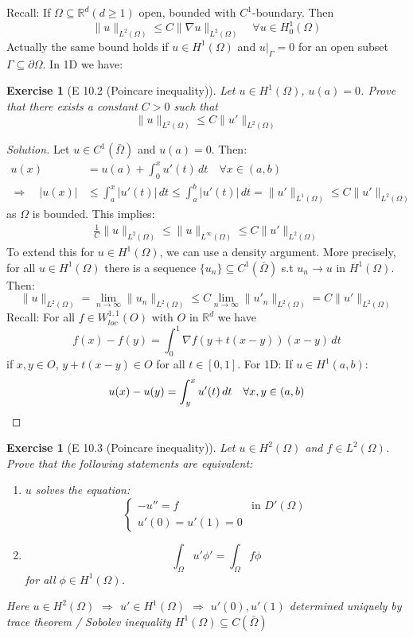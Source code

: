 \documentclass{report}
\theoremstyle{tommy}
\newtheorem{ex}[defn]{Exercise}
\begin{document}
  Recall: If \(\Omega \subseteq \mathbb{R}^d (d \ge 1)\) open, bounded with \(C^1\)-boundary. Then 
  \[\|u\|_{L^2(\Omega)} \le C \|\nabla u\|_{L^2(\Omega)} \quad \forall u \in H_0^1(\Omega)\]
  Actually the same bound holds if \(u \in H^1(\Omega)\) and \(u|_\Gamma = 0\) for an open subset \(\Gamma \subseteq \partial \Omega\). In 1D we have:


  \begin{ex}[E 10.2 (Poincare inequality)]
    Let \(u \in H^1(\Omega)\), \(u(a) = 0\).
    Prove that there exists a constant \(C > 0\) such that 
    \[\|u\|_{L^2(\Omega)} \le C \|u'\|_{L^2(\Omega)}\]
  \end{ex}

  \begin{proof}[Solution]
    Let \(u \in C^1(\bar \Omega)\) and \(u(a) = 0\). Then:
    \begin{align*}
      u(x) &= u(a) + \int_0^x u'(t) \, dt \quad \forall x \in (a,b) \\ 
      \Rightarrow \quad |u(x)| &\le \int_a^x |u'(t)|\, dt \le \int_a^b|u'(t)| \, dt = \|u'\|_{L^1(\Omega)} \le C\|u'\|_{L^2(\Omega)}
    \end{align*}
    as \(\Omega\) is bounded. This implies:
    \begin{align*}
      \frac{1}{C} \|u\|_{L^2(\Omega)} \le \|u\|_{L^\infty(\Omega)} \le C \|u'\|_{L^2(\Omega)}
    \end{align*}
    To extend this for \(u \in H^1(\Omega)\), we can use a density argument. More precisely, for all \(u \in H^1(\Omega)\) there is a sequence \(\{u_n\} \subseteq C^1(\bar \Omega)\) s.t \(u_n \to u\) in \(H^1(\Omega)\). Then:
    \[\|u\|_{L^2(\Omega)} = \lim_{n \to \infty} \|u_n\|_{L^2(\Omega)} \le C \lim_{n \to \infty} \|u'_n\|_{L^2(\Omega)} = C\|u'\|_{L^2(\Omega)}\]
    Recall: For all \(f \in W_{loc}^{1,1}(O)\) with \(O\) in \(\mathbb{R}^d\) we have
    \[
      f(x) - f(y) = \int_0^1\nabla f(y + t(x-y))(x-y) \, dt 
    \]
    if \(x,y \in O\), \(y + t(x-y) \in O\) for all \(t \in [0,1]\). For 1D: If \(u \in H^1(a,b)\):
    \[
      u(x) - u(y) = \int_y^x u'(t) \, dt \quad \forall x,y \in (a,b) \qedhere
    \]
  \end{proof}

  \begin{ex}[E 10.3 (Poincare inequality)]
    Let \(u \in H^2(\Omega)\) and \(f \in L^2(\Omega)\). Prove that the following statements are equivalent:
    \begin{enumerate}[label=\alph*)]
      \item \(u\) solves the equation:
      \[\begin{cases}
        - u'' = f & \text{in } D'(\Omega) \\ u'(0) = u'(1) = 0
      \end{cases}\]
      \item \[\int_\Omega u' \phi' = \int_\Omega f \phi\] for all \(\phi \in H^1(\Omega)\).
    \end{enumerate}
    Here \(u \in H^2(\Omega)\) \(\Rightarrow\) \(u' \in H^1(\Omega)\) \(\Rightarrow\) \(u'(0), u'(1)\) determined uniquely by trace theorem / Sobolev inequality \(H^1(\Omega) \subseteq C(\bar \Omega)\) 
  \end{ex}
\end{document}
